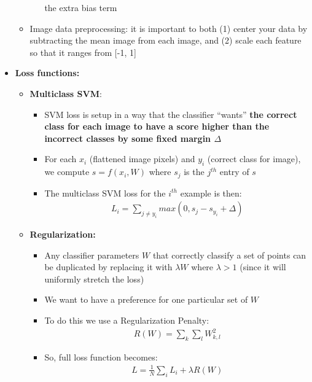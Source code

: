 \documentclass[12pt]{article}
\begin{document}
\begin{itemize}
\begin{itemize}
\begin{itemize}
          the extra bias term
        \end{itemize}
        \item Image data preprocessing: it is important to both (1) center your data by subtracting the mean image from each
        image, and (2) scale each feature so that it ranges from [-1, 1]
    \end{itemize}
    \item \textbf{Loss functions:}
    \begin{itemize}
      \item \textbf{Multiclass SVM}:
      \begin{itemize}
        \item SVM loss is setup in a way that the classifier ``wants'' \textbf{the correct class for each image to have a score higher than
        the incorrect classes by some fixed margin $\Delta$}
        \item For each $x_i$ (flattened image pixels) and $y_i$ (correct class for image), we compute $s = f(x_i, W)$ where $s_j$ is the
        $j^{th}$ entry of $s$
        \item The multiclass SVM loss for the $i^{th}$ example is then: 
        \begin{gather*}
          L_i = \sum\limits_{j \neq y_i}max(0, s_j - s_{y_i} + \Delta)
        \end{gather*}
      \end{itemize}
      \item \textbf{Regularization:}
      \begin{itemize}
        \item Any classifier parameters $W$ that correctly classify a set of points can be duplicated by replacing
        it with $\lambda W$ where $\lambda > 1$ (since it will uniformly stretch the loss)
        \item We want to have a preference for one particular set of $W$
        \item To do this we use a Regularization Penalty: 
        \begin{gather*}
          R(W) = \sum\limits_k\sum\limits_l W_{k, l}^2
        \end{gather*}
        \item So, full loss function becomes:
        \begin{gather*}
          L = \frac{1}{N}\sum\limits_i L_i + \lambda R(W)
        \end{gather*}
      \end{itemize}
    \end{itemize}

\end{itemize}
\end{document}
